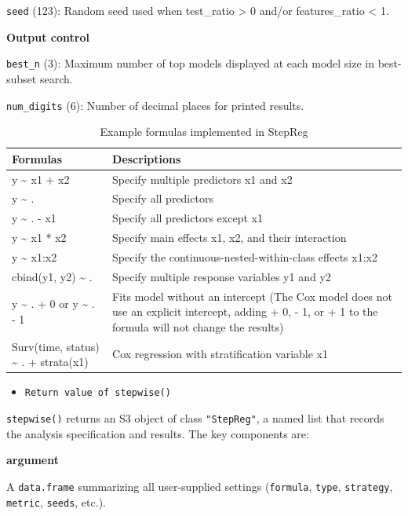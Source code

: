 \texttt{seed} (123): Random seed used when test\_ratio \textgreater{} 0 and/or features\_ratio \textless{} 1.

\textbf{Output control}

\texttt{best\_n} (3): Maximum number of top models displayed at each model size in best-subset search.

\texttt{num\_digits} (6): Number of decimal places for printed results.

\begin{table}

\caption{\label{tab:stepreg-formula-static}Example formulas implemented in StepReg}
\centering
\begin{tabular}[t]{p{6cm}p{8cm}}
\toprule
\textbf{Formulas} & \textbf{Descriptions}\\
\midrule
y \textasciitilde{} x1 + x2 & Specify multiple predictors x1 and x2\\
y \textasciitilde{} . & Specify all predictors\\
y \textasciitilde{} . - x1 & Specify all predictors except x1\\
y \textasciitilde{} x1 * x2 & Specify main effects x1, x2, and their interaction\\
y \textasciitilde{} x1:x2 & Specify the continuous-nested-within-class effects x1:x2\\
cbind(y1, y2) \textasciitilde{} . & Specify multiple response variables y1 and y2\\
y \textasciitilde{} . + 0 or y \textasciitilde{} . - 1 & Fits model without an intercept (The Cox model does not use an explicit intercept, adding + 0, - 1, or + 1 to the formula will not change the results)\\
Surv(time, status) \textasciitilde{} . + strata(x1) & Cox regression with stratification variable x1\\
\bottomrule
\end{tabular}
\end{table}

\begin{itemize}
\tightlist
\item
  \texttt{Return\ value\ of\ stepwise()}
\end{itemize}

\texttt{stepwise()} returns an S3 object of class \texttt{"StepReg"}, a named list that records the analysis specification and results. The key components are:

\textbf{argument}

A \texttt{data.frame} summarizing all user-supplied settings (\texttt{formula}, \texttt{type}, \texttt{strategy}, \texttt{metric}, \texttt{seeds}, etc.).

